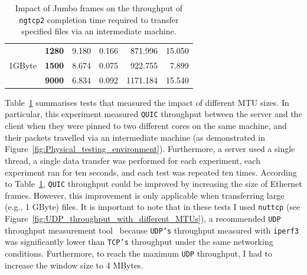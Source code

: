 \documentclass[12pt,a4paper]{report}
\begin{document}
\begin{table}[htbp]
\begin{tabular}{|c|l|r|r|r|r|}
\multirow{3}{*}{1GByte}                                                         & \textbf{1280}                                                                               & 9.180                     & 0.166                                                                              & 871.996                   & 15.050                                                                             \\ \cline{2-6} 
                                                                                & \textbf{1500}                                                                               & 8.674                     & 0.075                                                                              & 922.755                   & 7.899                                                                              \\ \cline{2-6} 
                                                                                & \textbf{9000}                                                                               & 6.834                     & 0.092                                                                              & 1171.184                  & 15.540                                                                             \\ \hline
\end{tabular}

    \centering
    \caption[Impact of Jumboframes for the throughput of \texttt{ngtcp2} completion time required to transfer specified files]{Impact of Jumbo frames on the throughput of \texttt{ngtcp2} completion time required to transfer specified files via an intermediate machine.}
    \label{fig:Impact_of_Jumbo_frames_for_ngtcp2_throughput}
\end{table}
  
   Table~\ref{fig:Impact_of_Jumbo_frames_for_ngtcp2_throughput} summarises tests that measured the impact of different MTU sizes.    
    In particular, this experiment measured \texttt{QUIC} throughput between the server and the client when they were pinned to two different cores on the same machine, and their packets travelled via an intermediate machine (as demonstrated in Figure~\ref{fig:Physical_testing_environment}).
    Furthermore, a server used a single thread, a single data transfer was performed for each experiment, each experiment ran for ten seconds, and each test was repeated ten times.
    According to Table~\ref{fig:Impact_of_Jumbo_frames_for_ngtcp2_throughput}, \texttt{QUIC} throughput could be improved by increasing the size of Ethernet frames.
    However, this improvement is only applicable when transferring large (e.g., 1 GByte) files.
    It is important to note that in these tests I used \texttt{nuttcp} (see Figure~\ref{fig:UDP_throughput_with_different_MTUs}), a recommended \texttt{UDP} throughput measurement tool~\cite{network-troubleshooting-tools_nuttcp} because  \texttt{UDP's} throughput measured with \texttt{iperf3} was significantly lower than \texttt{TCP's} throughput under the same networking conditions.
    Furthermore, to reach the maximum \texttt{UDP} throughput, I had to increase the window size to 4 MBytes.
    
\end{document}
